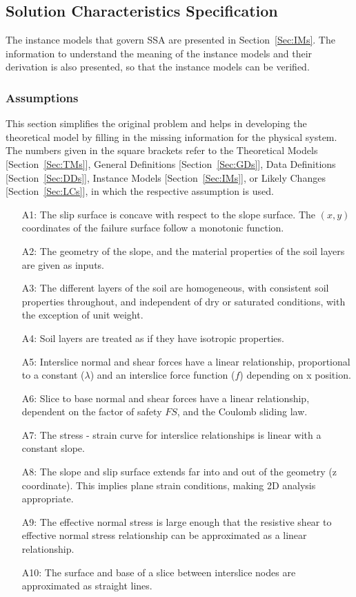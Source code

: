 \documentclass[12pt]{article}
\begin{document}
\subsection{Solution Characteristics Specification}
\label{Sec:SolCharSpec}
The instance models that govern SSA are presented in Section~\ref{Sec:IMs}. The information to understand the meaning of the instance models and their derivation is also presented, so that the instance models can be verified.
\subsubsection{Assumptions}
\label{Sec:Assumps}
This section simplifies the original problem and helps in developing the theoretical model by filling in the missing information for the physical system. The numbers given in the square brackets refer to the Theoretical Models {[}Section~\ref{Sec:TMs}{]}, General Definitions {[}Section~\ref{Sec:GDs}{]}, Data Definitions {[}Section~\ref{Sec:DDs}{]}, Instance Models {[}Section~\ref{Sec:IMs}{]}, or Likely Changes {[}Section~\ref{Sec:LCs}{]}, in which the respective assumption is used.
\begin{itemize}
\item[A1:]The slip surface is concave with respect to the slope surface. The $(x,y)$ coordinates of the failure surface follow a monotonic function.
\item[A2:]The geometry of the slope, and the material properties of the soil layers are given as inputs.
\item[A3:]The different layers of the soil are homogeneous, with consistent soil properties throughout, and independent of dry or saturated conditions, with the exception of unit weight.
\item[A4:]Soil layers are treated as if they have isotropic properties.
\item[A5:]Interslice normal and shear forces have a linear relationship, proportional to a constant ($λ$) and an interslice force function ($f$) depending on x position.
\item[A6:]Slice to base normal and shear forces have a linear relationship, dependent on the factor of safety $FS$, and the Coulomb sliding law.
\item[A7:]The stress - strain curve for interslice relationships is linear with a constant slope.
\item[A8:]The slope and slip surface extends far into and out of the geometry (z coordinate). This implies plane strain conditions, making 2D analysis appropriate.
\item[A9:]The effective normal stress is large enough that the resistive shear to effective normal stress relationship can be approximated as a linear relationship.
\item[A10:]The surface and base of a slice between interslice nodes are approximated as straight lines.
\end{itemize}
\end{document}
